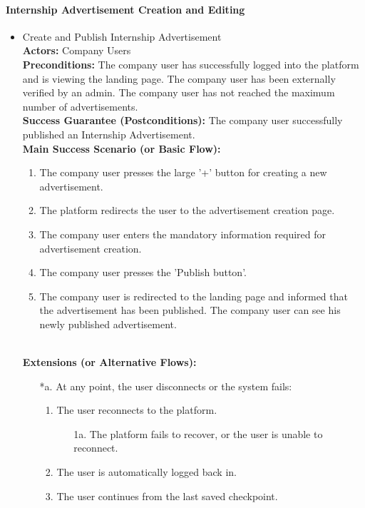 \paragraph{Internship Advertisement Creation and Editing}
\begin{itemize}[label={[\textbf{UC}]}, align=left, leftmargin=*]
     \item {} Create and Publish Internship Advertisement \\
     \textbf{Actors:} Company Users\\
     \textbf{Preconditions:} The company user has successfully logged into the platform and is viewing the landing page. The company user has been externally verified by an admin. The company user has not reached the maximum number of advertisements.\\
     \textbf{Success Guarantee (Postconditions):} The company user successfully published an Internship Advertisement. \\
     \textbf{Main Success Scenario (or Basic Flow):} 
     \begin{enumerate}[label=\arabic*.] 
        \item The company user presses the large '+' button for creating a new advertisement. 
        \item The platform redirects the user to the advertisement creation page.
        \item The company user enters the mandatory information required for advertisement creation.
        \item The company user presses the 'Publish button'.
        \item The company user is redirected to the landing page and informed that the advertisement has been published. The company user can see his newly published advertisement.
     \end{enumerate} \\

    \textbf{Extensions (or Alternative Flows):} 
    \begin{enumerate}[label=\arabic*.]
        \item[*a.] At any point, the user disconnects or the system fails:
            \begin{enumerate}[label=\arabic*.]
                \item The user reconnects to the platform.
                    \begin{enumerate}[label=\alph*.]
                        \item[1a.] The platform fails to recover, or the user is unable to reconnect.
                    \end{enumerate}
                 \item The user is automatically logged back in.
                 \item The user continues from the last saved checkpoint.
            \end{enumerate}
        

\end{enumerate}
\end{itemize}
